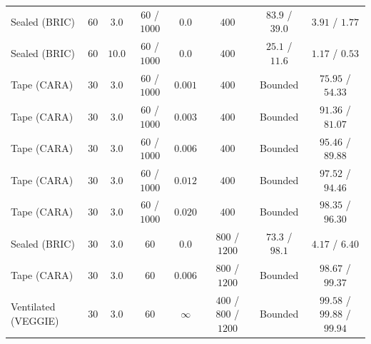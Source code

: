 \documentclass[preprint,11pt,numbers,sort&compress]{elsarticle}
\begin{document}
\begin{table}[htbp]
{\begin{tabular}{lccccccc}
Sealed (BRIC) & $60$ & $3.0$ & $60$ / $1000$ & $0.0$ & $400$ & $83.9$ / $39.0$ & $3.91$ / $1.77$ \\
Sealed (BRIC) & $60$ & $10.0$ & $60$ / $1000$ & $0.0$ & $400$ & $25.1$ / $11.6$ & $1.17$ / $0.53$ \\
\midrule
Tape (CARA) & $30$ & $3.0$ & $60$ / $1000$ & $0.001$ & $400$ & Bounded & $75.95$ / $54.33$ \\
Tape (CARA) & $30$ & $3.0$ & $60$ / $1000$ & $0.003$ & $400$ & Bounded & $91.36$ / $81.07$ \\
Tape (CARA) & $30$ & $3.0$ & $60$ / $1000$ & $0.006$ & $400$ & Bounded & $95.46$ / $89.88$ \\
Tape (CARA) & $30$ & $3.0$ & $60$ / $1000$ & $0.012$ & $400$ & Bounded & $97.52$ / $94.46$ \\
Tape (CARA) & $30$ & $3.0$ & $60$ / $1000$ & $0.020$ & $400$ & Bounded & $98.35$ / $96.30$ \\
\midrule
Sealed (BRIC) & $30$ & $3.0$ & $60$ & $0.0$ & $800$ / $1200$ & $73.3$ / $98.1$ & $4.17$ / $6.40$ \\
Tape (CARA) & $30$ & $3.0$ & $60$ & $0.006$ & $800$ / $1200$ & Bounded & $98.67$ / $99.37$ \\
Ventilated (VEGGIE) & $30$ & $3.0$ & $60$ & $\infty$ & $400$ / $800$ / $1200$ & Bounded & $99.58$ / $99.88$ / $99.94$ \\
\bottomrule
\end{tabular}%
}
\end{table}
\end{document}
